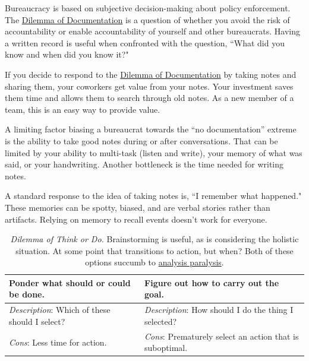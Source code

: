 Bureaucracy is based on subjective decision-making about policy enforcement. The \hyperref[table:dilemma-personal-notes-or-no-notes]{Dilemma of Documentation} is a question of whether you avoid the risk of accountability or enable accountability of yourself and other bureaucrats. Having a written record is useful when confronted with the question, ``What did you know and when did you know it?"

If you decide to respond to the \hyperref[table:dilemma-personal-notes-or-no-notes]{Dilemma of Documentation} by taking notes and sharing them, your coworkers get value from your notes. Your investment saves them time and allows them to search through old notes. 
As a new member of a team, this is an easy way to provide value.  

A limiting factor biasing a bureaucrat towards the ``no documentation'' extreme is the ability to take good notes during or after conversations. That can be limited by your ability to multi-task (listen and write), your memory of what was said, or your handwriting. Another bottleneck is the time needed for writing notes.

A standard response to the idea of taking notes is, ``I remember what happened." These memories can be spotty, biased, and are verbal stories rather than artifacts. 
Relying on memory to recall events doesn't work for everyone. 

\begin{center}
\begin{table}[H] %
\begin{tabular}{ | m{\dilemmatablewidth}| m{\dilemmatablewidth} | } 
  \hline
  \textbf{Ponder what should or could be done.} &
  \textbf{Figure out how to carry out the goal.}\\
  \hline
  \textit{Description}: Which of these should I select? & 
  \textit{Description}: How should I do the thing I selected? \\
  \hline
  \textit{Cons}: Less time for action. & 
  \textit{Cons}: Prematurely select an action that is suboptimal. \\
  \hline
\end{tabular}
\caption{\textit{Dilemma of Think or Do.}
Brainstorming is useful, as is considering the holistic situation. At some point that transitions to action, but when? %
Both of these options succumb to \href{https://en.wikipedia.org/wiki/Analysis_paralysis}{analysis paralysis}.
}
\label{table:dilemma-personal-forest-vs-trees}
\end{table}
\end{center}

